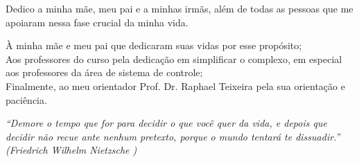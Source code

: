 \documentclass[12pt,
               openright,
               oneside,
               english,
               brazil]{abntex2}
\begin{document}
		
	\setcounter{page}{1}
	
	\newpage
		
	\newpage

                \begin{dedicatoria}
                \vspace*{\fill}
                \begin{flushright}
                \begin{minipage}{8.1cm}\footnotesize
                  Dedico a minha mãe, meu pai e a minhas irmãs, além de todas as pessoas que me apoiaram nessa fase crucial da minha vida.
        	\end{minipage}
            \end{flushright}
                \end{dedicatoria}
    
        
        \begin{agradecimentos}
        À minha mãe e meu pai que dedicaram suas vidas por esse propósito;\\
        Aos professores do curso pela dedicação em simplificar o complexo, em especial aos professores da área de sistema de controle;\\
        Finalmente, ao meu orientador Prof. Dr. Raphael Teixeira pela sua orientação e paciência.
        \end{agradecimentos}

        \newpage
        \begin{epigrafe}
        \vspace*{\fill}
        \begin{flushright}
        \begin{minipage}{8.1cm}\footnotesize
                      \textit{``Demore o tempo que for para decidir o que você quer da vida, e depois que decidir não recue ante nenhum pretexto, porque o mundo tentará te dissuadir.''\\ (Friedrich Wilhelm Nietzsche )}
            	\end{minipage}
        \end{flushright}
        \end{epigrafe}
\end{document}

